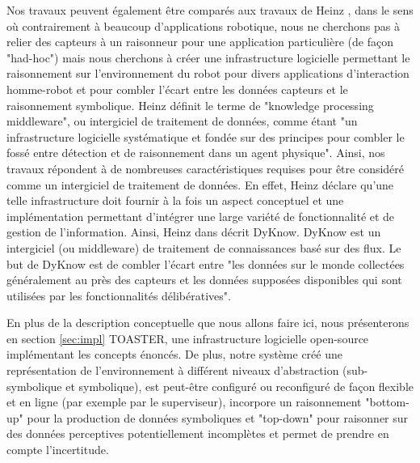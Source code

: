 \documentclass[a4paper,11pt,twoside]{StyleThese}
\begin{document}
Nos travaux peuvent également être comparés aux travaux de Heinz \cite{heintz2009dyknow}, dans le sens où contrairement à beaucoup d'applications robotique, nous ne cherchons pas à relier des capteurs à un raisonneur pour une application particulière (de façon "had-hoc") mais nous cherchons à créer une infrastructure logicielle permettant le raisonnement sur l'environnement du robot pour divers applications d'interaction homme-robot et pour combler l'écart entre les données capteurs et le raisonnement symbolique. Heinz définit le terme de "knowledge processing middleware"\cite{heintz2008knowledge}, ou intergiciel de traitement de données, comme étant "un infrastructure logicielle systématique et fondée sur des principes pour combler le fossé entre détection et de raisonnement dans un agent physique". Ainsi, nos travaux répondent à de nombreuses caractéristiques requises pour être considéré comme un intergiciel de traitement de données. En effet, Heinz déclare qu'une telle infrastructure doit fournir à la fois un aspect conceptuel et une implémentation permettant d'intégrer une large variété de fonctionnalité et de gestion de l'information. Ainsi, Heinz dans \cite{heintz2010bridging} décrit DyKnow. DyKnow est un intergiciel (ou middleware) de traitement de connaissances basé sur des flux. Le but de DyKnow est de combler l'écart entre "les données sur le monde collectées généralement au près des capteurs et les données supposées disponibles qui sont utilisées par les fonctionnalités délibératives".

En plus de la description conceptuelle que nous allons faire ici, nous présenterons en section \ref{sec:impl} TOASTER, une infrastructure logicielle open-source implémentant les concepts énoncés. De plus, notre système créé une représentation de l'environnement à différent niveaux d'abstraction (sub-symbolique et symbolique), est peut-être configuré ou reconfiguré de façon flexible et en ligne (par exemple par le superviseur), incorpore un raisonnement "bottom-up" pour la production de données symboliques et "top-down" pour raisonner sur des données perceptives potentiellement incomplètes et permet de prendre en compte l'incertitude.
\end{document}
